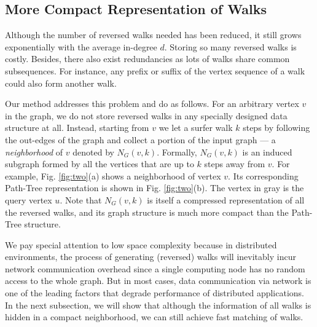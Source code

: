 \documentclass[conference]{IEEEtran}
\theoremstyle{definition}
\theoremstyle{definition}
\begin{document}
\subsection {More Compact Representation of Walks}
\iffalse
Because all reversed walks existing in the topology of the input graph are generated no matter whether they finally contribute to the final similarities or not, the amount of walks is huge.
To be more precise Specifically, if the cardinality of neighborhood of query vertex $u$ is $C$, then a total of $Cd^k$ walks will be generated. 
Thus,  to efficiently compute SimRank, we need to consider the following factors: 1)compact representation of walks, which will save memory; and 2)fast search of matching pairs, which is closely related to the overall performance. 
\fi
Although the number of reversed walks needed has been reduced, it still grows exponentially with the average in-degree $d$.
Storing so many reversed walks is costly.
Besides, there also exist redundancies as  lots of walks share common subsequences.
For instance, any prefix or suffix of the vertex sequence of a walk could also form another walk.

Our method  addresses this problem and do as follows. 
For an arbitrary vertex $v$ in the graph, we do not  store  reversed walks  in any specially designed data structure at all. 
Instead, starting from $v$ we let a surfer walk  $k$ steps by following the out-edges of the graph and collect a portion of the input graph --- a {\em neighborhood} of $v$ denoted by $N_{G}(v, k)$.
Formally, $N_{G}(v, k)$ is an induced subgraph formed by all the vertices that are up to $k$ steps away from $v$. 
For example, Fig. \ref{fig:two}(a) shows a neighborhood of vertex $v$. 
Its corresponding Path-Tree representation is shown in Fig. \ref{fig:two}(b). 
The vertex in gray is the  query vertex  $u$. 
Note that $N_{G}(v, k)$ is itself a compressed representation of all the reversed walks, and its graph structure is much more compact than the Path-Tree structure.

We pay special attention to low space complexity because in distributed environments, the process of generating (reversed) walks will inevitably incur network communication overhead since a single computing node has no random access to  the whole graph.
 But in most cases,  data communication via network is one of the leading factors that degrade performance of distributed applications.
 In the next subsection, we will show that although the information of  all walks is hidden in a compact neighborhood, we can still  achieve fast matching of walks.
 
\end{document}
